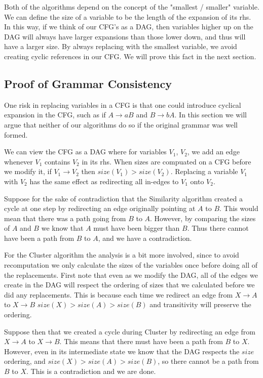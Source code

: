 \documentclass[11pt]{article}
\begin{document}
Both of the algorithms depend on the concept of the "smallest / smaller"
variable. We can define the size of a variable to be the length of
the expansion of its rhs. In this way, if we think of our CFG's as a DAG, then
variables higher up on the DAG will always have larger expansions than
those lower down, and thus will have a larger size. By always replacing
with the smallest variable, we avoid creating cyclic references in our CFG.
We will prove this fact in the next section.

\subsection{Proof of Grammar Consistency}

One risk in replacing variables in a CFG is that one could introduce
cyclical expansion in the CFG, such as if 
$A\rightarrow aB$ and $B\rightarrow bA$. In this 
section we will argue that neither of our algorithms do so if the
original grammar was well formed.

We can view the CFG as a DAG where for variables $V_1$, $V_2$, we add an edge
whenever $V_1$ contains $V_2$ in its rhs. When sizes are compuated
on a CFG before we modify it, if $V_1 \rightarrow V_2$ then $size(V_1) > size(V_2)$.
Replacing a variable $V_1$ with
$V_2$ has the same effect as redirecting all in-edges to $V_1$ onto $V_2$.

Suppose for the sake of contradiction that the Similarity algorithm
created a cycle at one step by redirecting an edge originally pointing 
at $A$ to $B$. This would mean that there was a path going from 
$B$ to $A$. However, by comparing the sizes of $A$ and $B$ we know that
$A$ must have been bigger than $B$. Thus there cannot have been a path from $B$
to $A$, and we have a contradiction.

For the Cluster algorithm the analysis is a bit more involved, since
to avoid recomputation we only calculate the sizes of the variables once
before doing all of the replacements. First note that even as we modify
the DAG, all of the edges we create in the DAG will respect the ordering of
sizes that we calculated before we did any replacements. This is because
each time we redirect an edge from $X\rightarrow A$ to $X\rightarrow B$
$size(X)>size(A)>size(B)$ and transitivity will preserve the ordering.

Suppose then that we created a cycle during Cluster
by redirecting an edge from $X \rightarrow A$ to $X \rightarrow B$.
This means that there must have been a path from $B$ to $X$. However,
even in its intermediate state we know that the DAG respects the
$size$ ordering, and $size(X) > size(A) > size(B)$, so there cannot
be a path from $B$ to $X$. This is a contradiction and we are done.
\end{document}
